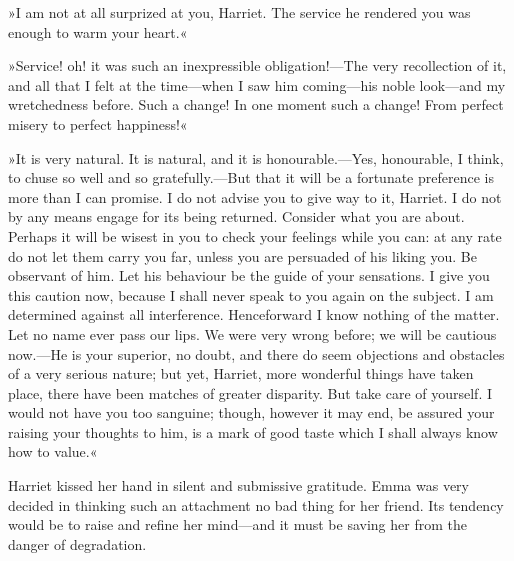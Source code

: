 »I am not at all surprized at you, Harriet. The service he rendered you was enough to warm your heart.«

»Service! oh! it was such an inexpressible obligation!—The very recollection of it, and all that I felt at the time—when I saw him coming—his noble look—and my wretchedness before. Such a change! In one moment such a change! From perfect misery to perfect happiness!«

»It is very natural. It is natural, and it is honourable.—Yes, honourable, I think, to chuse so well and so gratefully.—But that it will be a fortunate preference is more than I can promise. I do not advise you to give way to it, Harriet. I do not by any means engage for its being returned. Consider what you are about. Perhaps it will be wisest in you to check your feelings while you can: at any rate do not let them carry you far, unless you are persuaded of his liking you. Be observant of him. Let his behaviour be the guide of your sensations. I give you this caution now, because I shall never speak to you again on the subject. I am determined against all interference. Henceforward I know nothing of the matter. Let no name ever pass our lips. We were very wrong before; we will be cautious now.—He is your superior, no doubt, and there do seem objections and obstacles of a very serious nature; but yet, Harriet, more wonderful things have taken place, there have been matches of greater disparity. But take care of yourself. I would not have you too sanguine; though, however it may end, be assured your raising your thoughts to him, is a mark of good taste which I shall always know how to value.«

Harriet kissed her hand in silent and submissive gratitude. Emma was very decided in thinking such an attachment no bad thing for her friend. Its tendency would be to raise and refine her mind—and it must be saving her from the danger of degradation.